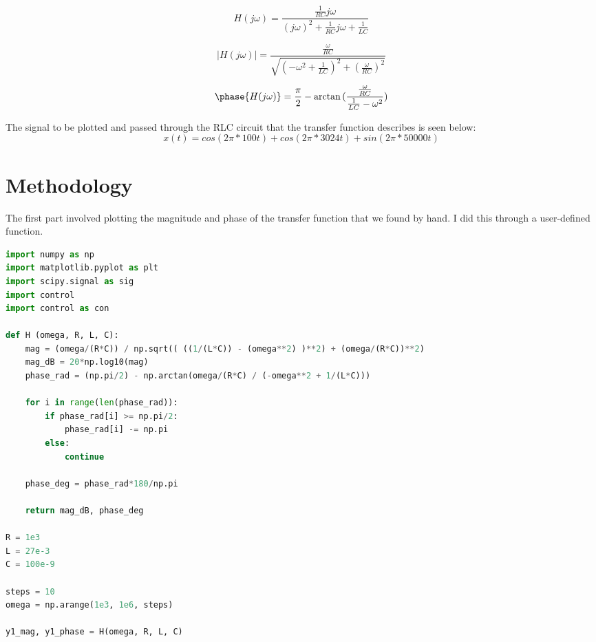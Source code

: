 \documentclass[12pt]{report}
\begin{document}
\begin{equation*}
H(j\omega) = \frac{\frac{1}{RC}j\omega}{(j\omega)^2+\frac{1}{RC}j\omega+\frac{1}{LC}}
\end{equation*}

\begin{equation*}
|H(j\omega)| = \frac{\frac{\omega}{RC}}{\sqrt{(-\omega^2+\frac{1}{LC})^2+(\frac{\omega}{RC})^2}}
\end{equation*}

\begin{equation*}
\phase{H(j\omega)} = \frac{\pi}{2} - \arctan{(\frac{\frac{\omega}{RC}}{\frac{1}{LC}-\omega^2})}
\end{equation*}

The signal to be plotted and passed through the RLC circuit that the transfer function describes is seen below:
\begin{equation*}
x(t) = cos(2\pi*100t) + cos(2\pi*3024t) +sin(2\pi*50000t)
\end{equation*}

\section{Methodology}
The first part involved plotting the magnitude and phase of the transfer function that we found by hand. I did this through a user-defined function.

\begin{lstlisting}[language=Python, caption= User-defined function for the magnitude and phase]
import numpy as np
import matplotlib.pyplot as plt
import scipy.signal as sig
import control
import control as con

def H (omega, R, L, C):
    mag = (omega/(R*C)) / np.sqrt(( ((1/(L*C)) - (omega**2) )**2) + (omega/(R*C))**2)
    mag_dB = 20*np.log10(mag)
    phase_rad = (np.pi/2) - np.arctan(omega/(R*C) / (-omega**2 + 1/(L*C)))
    
    for i in range(len(phase_rad)):
        if phase_rad[i] >= np.pi/2:
            phase_rad[i] -= np.pi
        else:
            continue
        
    phase_deg = phase_rad*180/np.pi 
    
    return mag_dB, phase_deg

R = 1e3
L = 27e-3
C = 100e-9

steps = 10
omega = np.arange(1e3, 1e6, steps)

y1_mag, y1_phase = H(omega, R, L, C)
\end{lstlisting}
\end{document}
